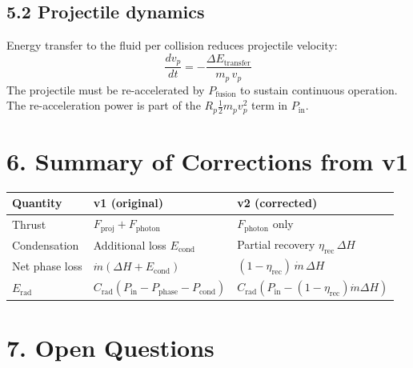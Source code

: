 \documentclass[12pt]{article}
\begin{document}
\subsection*{5.2 Projectile dynamics}
Energy transfer to the fluid per collision reduces projectile velocity:
\[
  \frac{dv_p}{dt} = -\frac{\Delta E_{\mathrm{transfer}}}{m_p\,v_p}
\]
The projectile must be re-accelerated by $P_{\mathrm{fusion}}$ to sustain continuous
operation. The re-acceleration power is part of the $R_p \tfrac{1}{2} m_p v_p^2$
term in $P_{\mathrm{in}}$.

\section*{6. Summary of Corrections from v1}

\begin{center}
\begin{tabular}{lll}
\toprule
\textbf{Quantity} & \textbf{v1 (original)} & \textbf{v2 (corrected)} \\
\midrule
Thrust & $F_{\mathrm{proj}} + F_{\mathrm{photon}}$ & $F_{\mathrm{photon}}$ only \\
Condensation & Additional loss $E_{\mathrm{cond}}$ & Partial recovery $\eta_{\mathrm{rec}}\,\Delta H$ \\
Net phase loss & $\dot{m}(\Delta H + E_{\mathrm{cond}})$ & $(1-\eta_{\mathrm{rec}})\,\dot{m}\,\Delta H$ \\
$E_{\mathrm{rad}}$ & $C_{\mathrm{rad}}(P_{\mathrm{in}}-P_{\mathrm{phase}}-P_{\mathrm{cond}})$ & $C_{\mathrm{rad}}(P_{\mathrm{in}}-(1-\eta_{\mathrm{rec}})\dot{m}\Delta H)$ \\
\bottomrule
\end{tabular}
\end{center}

\section*{7. Open Questions}
\end{document}
